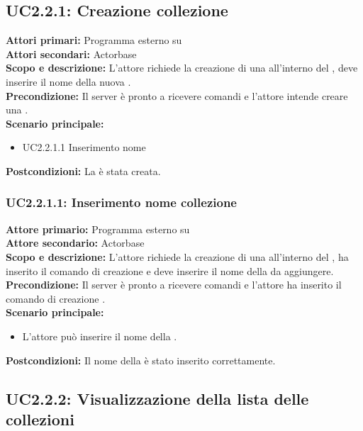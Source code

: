 \documentclass{scalatekids-article}
\begin{document}
\subsection{UC2.2.1: Creazione collezione}

\textbf{Attori primari:} Programma esterno su \\
\textbf{Attori secondari:} Actorbase\\
\textbf{Scopo e descrizione:} L'attore richiede la creazione di una  all'interno del , deve inserire il nome della nuova .\\
\textbf{Precondizione:} Il server è pronto a ricevere comandi e l'attore intende creare una .\\
\textbf{Scenario principale:}
\begin{itemize}
\item UC2.2.1.1 Inserimento nome 
\end{itemize}
\textbf{Postcondizioni:} La  è stata creata.

\subsubsection{UC2.2.1.1: Inserimento nome collezione}

\textbf{Attore primario:} Programma esterno su \\
\textbf{Attore secondario:} Actorbase\\
\textbf{Scopo e descrizione:} L'attore richiede la creazione di una  all'interno del , ha inserito il comando di creazione  e deve inserire il nome della  da aggiungere.\\
\textbf{Precondizione:} Il server è pronto a ricevere comandi e l'attore ha inserito il comando di creazione .\\
\textbf{Scenario principale:}
\begin{itemize}
\item L'attore può inserire il nome della .
\end{itemize}
\textbf{Postcondizioni:} Il nome della  è stato inserito correttamente.

\subsection{UC2.2.2: Visualizzazione della lista delle collezioni}
\end{document}
